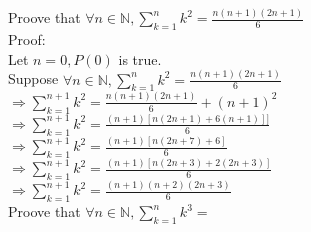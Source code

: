 \documentclass{article}
\begin{document}
\noindent Proove that $\forall n \in \mathbb{N}, \sum_{k=1}^{n}k^2 =
\frac{n(n+1)(2n+1)}{6}$\\

\noindent Proof:\\
Let $n = 0, P(0)$ is true.\\
Suppose $\forall n \in \mathbb{N}, \sum_{k=1}^{n}k^2 =
\frac{n(n+1)(2n+1)}{6}$\\
$\Rightarrow \sum_{k=1}^{n+1}k^2 = \frac{n(n+1)(2n+1)}{6} + (n+1)^2$\\
$\Rightarrow \sum_{k=1}^{n+1}k^2 = 
\frac{(n+1)[n(2n+1)+6(n+1)]]}{6}$\\
$\Rightarrow \sum_{k=1}^{n+1}k^2 = 
\frac{(n+1)[n(2n+7) + 6]}{6}$\\
$\Rightarrow \sum_{k=1}^{n+1}k^2 = 
\frac{(n+1)[n(2n+3) + 2(2n + 3)]}{6}$\\
$\Rightarrow \sum_{k=1}^{n+1}k^2 = 
\frac{(n+1)(n+2)(2n+3)}{6}$\\

\noindent Proove that $\forall n \in \mathbb{N}, \sum_{k=1}^{n}k^3 = 
\frac{}{}$
\end{document}

